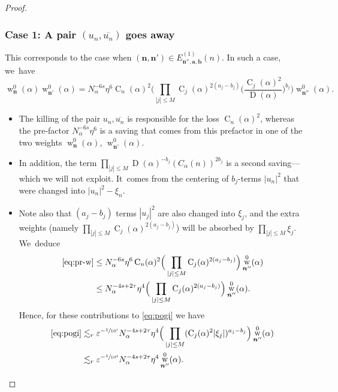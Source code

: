 \documentclass[JEP,XML,SOM,Unicode,published]{cedram}
\DeclareMathOperator{\rw}{w}
\theoremstyle{plain}
\theoremstyle{definition}
\newcommand{\nb}{{\boldsymbol n}}
\newcommand{\1}{\mathbf{1}}
\let\epsilon\varepsilon
\begin{document}
\begin{proof}
\subsubsection*{Case 1: A pair $(u_n,\overline{u_{n}})$ goes away} This corresponds to the case when $(\nb,\nb')\in E_{\nb'',\boldsymbol{a},\boldsymbol{b}}^{(1)}(n)$. In such a case, we~have
\begin{equation}
\label{eq:pr-w}
\rw_{\nb}^{0}(\alpha)\rw_{\nb'}^{0}(\alpha)
=N_\alpha^{-6s}\eta^{6}\operatorname{C}_{n}(\alpha)^2
\Big(\prod_{|j|\leq M}\operatorname{C}_{j}(\alpha)^{2(a_{j}-b_{j})}
\Big(\frac{\operatorname{C}_{j}(\alpha)^{2}}{\operatorname{D}(\alpha)}\Big)^{b_{j}}
\Big)
\rw_{\nb''}^{0}(\alpha).
\end{equation}

\begin{itemize}
\item
The killing of the pair $u_n,\overline{u_{n}}$ is responsible for the loss $\operatorname{C}_{n}(\alpha)^2$, whereas the pre-factor $N_{\alpha}^{-6s}\eta^{6}$ is a saving that comes from this prefactor in one of the two weights $\rw_{\nb}^{0}(\alpha)$, $\rw_{\nb'}^{0}(\alpha)$.

\item
In addition, the term $\prod_{|j|\leq M}\operatorname{D}(\alpha)^{-b_{j}}(C_\alpha(n))^{2b_{j}}$ is a second saving---which we will not exploit. It~comes from the centering of $b_{j}$-terms $|u_n|^{2}$ that were changed into $|u_{n}|^{2}-\xi_{n}$.

\item
Note also that $(a_{j}-b_{j})$ terms $|u_{j}|^{2}$ are also changed into $\xi_j$, and the extra weights (namely $\prod_{|j|\leq M}\operatorname{C}_{j}(\alpha)^{2(a_{j}-b_{j})}$) will be absorbed by $\prod_{|j|\leq M}\xi_{j}$. We~deduce
\begin{align*}
\eqref{eq:pr-w}
&\leq N_{\alpha}^{-6s}\eta^{6}\operatorname{C}_{n}(\alpha)^2
\Big(
\prod_{|j|\leq M}\operatorname{C}_{j}(\alpha)^{2(a_{j}-b_{j})}
\Big)
\rw_{\nb''}^{0}(\alpha) \\
&\leq N_\alpha^{-4s+2\tau}\eta^{4}
\Big(\prod_{|j|\leq M}\operatorname{C}_{j}(\alpha)^{2(a_{j}-b_{j})}
\Big)
\rw_{\nb''}^{0}(\alpha).
\end{align*}
Hence, for these contributions to \eqref{eq:pogi} we have
\begin{align*}
\eqref{eq:pogi}
&\lesssim_{r} \epsilon^{-\sfrac{1}{10^{4}}}
N_{\alpha}^{-4s+2\tau}\eta^{4}
\Big(\prod_{|j|\leq M}(\mathrm{C}_{j}(\alpha)^{2}|\xi_{j}|)^{a_{j}-b_{j}}
\Big)
\rw_{\nb''}^{0}(\alpha) \\
&\lesssim_{r}
\epsilon^{-\sfrac{1}{10^{4}}}
N_{\alpha}^{-4s+2\tau}\eta^{4}
\rw_{\nb''}^{0}(\alpha).
\end{align*}
\end{itemize}


\end{proof}
\end{document}
